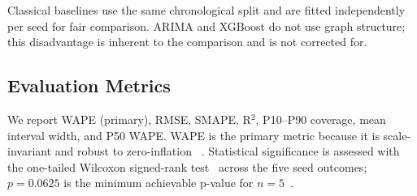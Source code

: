 Classical baselines use the same chronological split and are fitted
independently per seed for fair comparison. ARIMA and XGBoost do
not use graph structure; this disadvantage is inherent to the
comparison and is not corrected for.

\subsection{Evaluation Metrics}

We report WAPE (primary), RMSE, SMAPE, R$^2$, P10--P90 coverage,
mean interval width, and P50 WAPE. WAPE is the primary metric
because it is scale-invariant and robust to zero-inflation
~\cite{makridakis2022m5}. Statistical significance is assessed with
the one-tailed Wilcoxon signed-rank test~\cite{wilcoxon1945} across
the five seed outcomes; $p{=}0.0625$ is the minimum achievable
p-value for $n{=}5$~\cite{gneiting2007scoring}.
